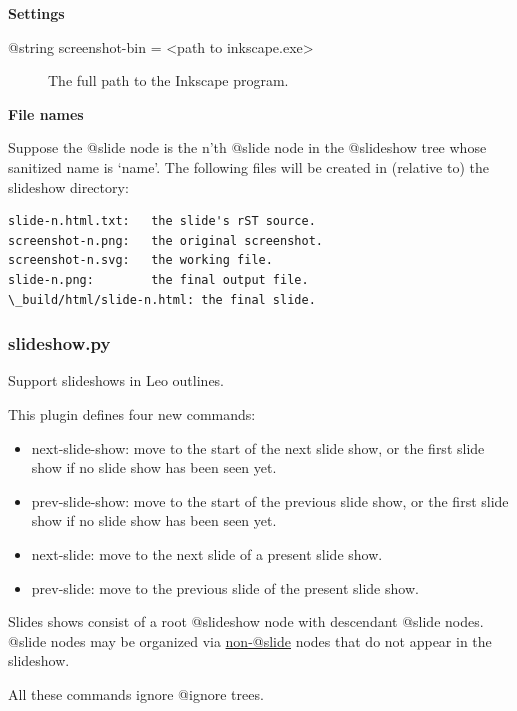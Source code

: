 \documentclass[a4paper,10pt,english]{sphinxmanual}
\begin{document}
\textbf{Settings}
\begin{description}
\item[{@string screenshot-bin = \textless{}path to inkscape.exe\textgreater{}}] \leavevmode
The full path to the Inkscape program.

\end{description}

\textbf{File names}

Suppose the @slide node is the n'th @slide node in
the @slideshow tree whose sanitized name is
`name'. The following files will be created in
(relative to) the slideshow directory:

\begin{Verbatim}[commandchars=\\\{\}]
slide-n.html.txt:   the slide's rST source.
screenshot-n.png:   the original screenshot.
screenshot-n.svg:   the working file.
slide-n.png:        the final output file.
\_build/html/slide-n.html: the final slide.
\end{Verbatim}


\subsubsection{slideshow.py}
\label{plugins:slideshow-py}
Support slideshows in Leo outlines.

This plugin defines four new commands:
\begin{itemize}
\item {} 
next-slide-show:  move to the start of the next slide show,
or the first slide show if no slide show has been seen yet.

\item {} 
prev-slide-show:  move to the start of the previous slide show,
or the first slide show if no slide show has been seen yet.

\item {} 
next-slide: move to the next slide of a present slide show.

\item {} 
prev-slide: move to the previous slide of the present slide show.

\end{itemize}

Slides shows consist of a root @slideshow node with descendant @slide nodes.
@slide nodes may be organized via \href{mailto:non-@slide}{non-@slide} nodes that do not appear in the slideshow.

All these commands ignore @ignore trees.
\end{document}
